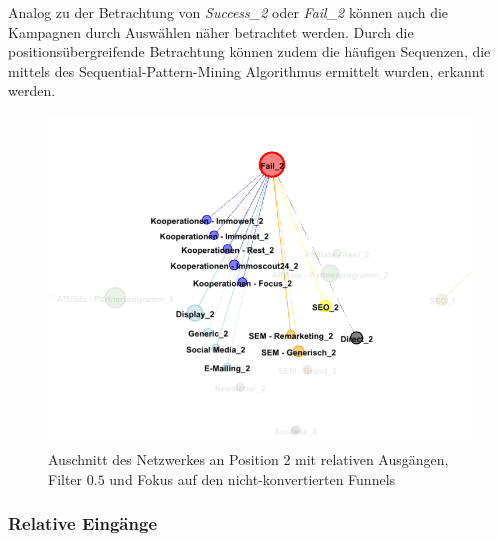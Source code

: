 Analog zu der Betrachtung von \textit{Success\_2} oder \textit{Fail\_2} können auch die Kampagnen durch Auswählen näher betrachtet werden. Durch die positionsübergreifende Betrachtung können zudem die häufigen Sequenzen, die mittels des Sequential-Pattern-Mining Algorithmus ermittelt wurden, erkannt werden.
\begin{figure}[H]
	\centering\includegraphics[scale=0.4]{out_filter_50_fail.png}\caption[Relative Ausgänge mit Filter $0.5$]{Auschnitt des Netzwerkes an Position $2$ mit relativen Ausgängen, Filter $0.5$ und Fokus auf den nicht-konvertierten Funnels}\label{out_filter_50_fail}
\end{figure}

\subsubsection*{Relative Eingänge}

